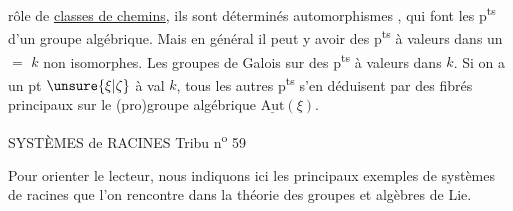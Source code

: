 rôle de \uline{classes de chemins}, ils sont déterminés   automorphismes , qui font les p\textsuperscript{ts} d'un groupe algébrique. Mais en général il peut y avoir des p\textsuperscript{ts} à valeurs dans un $=$ $k$ non isomorphes. Les groupes de Galois  sur   des p\textsuperscript{ts} à valeurs dans $k$. Si on a un pt $\unsure{\xi|\zeta}$ à val  $k$, tous les autres p\textsuperscript{ts} s'en déduisent par des fibrés principaux  sur le (pro)groupe algébrique $\underline{\mathrm{Aut}}(\xi)$.


SYSTÈMES de RACINES \hfill Tribu n\textsuperscript{o} 59

Pour orienter le lecteur, nous indiquons ici les principaux exemples de systèmes de racines que l'on rencontre dans la théorie des groupes \unsure{$\cdot$}et algèbres de Lie.

